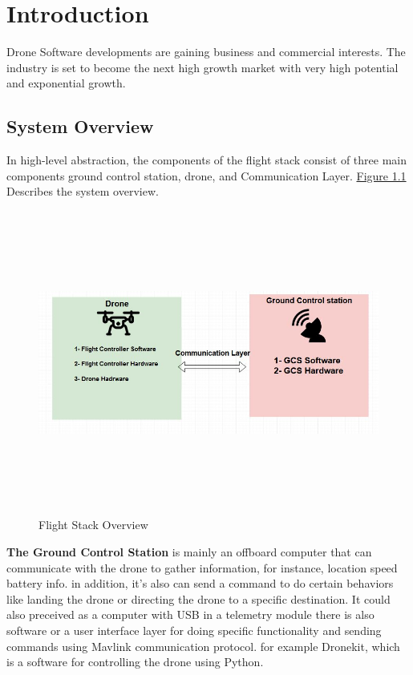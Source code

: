 
\chapter{Introduction}

Drone Software developments are gaining business and commercial interests.
The industry is set to become the next high growth market with very high potential and exponential growth.

\section{System Overview}


In high-level abstraction, the components of the flight stack consist of three main components ground control station, drone, and Communication Layer.
\hyperref[fig:systemoverview]{Figure 1.1} Describes the system overview. 
 \begin{figure}[H]
\includegraphics[width=12cm,height=10cm]{images/1.jpg}
\caption{Flight Stack Overview}
\label{fig:systemoverview}
\end{figure}
\cleardoublepage



\noindent \textbf{The Ground Control Station} is mainly an offboard computer that can communicate with the drone to gather information, for instance, location speed battery info. in addition, it's also can send a command to do certain behaviors like landing the drone or directing the drone to a specific destination.
It could also preceived as a computer with USB in a telemetry module there is also software or a user interface layer for doing specific functionality and sending commands using Mavlink communication protocol. for example Dronekit, which is a software for controlling the drone using Python. 

